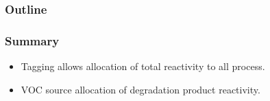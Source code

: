 \begin{frame}
    \frametitle{Outline} 
    \begin{flushleft}
        \tableofcontents[currentsection]
    \end{flushleft}
\end{frame} 

\begin{frame}
    \frametitle{Summary}

    \begin{itemize}
        \item Tagging allows allocation of total reactivity to all process. \vspace{8mm}
        \item VOC source allocation of degradation product reactivity.
    \end{itemize}
\end{frame}
